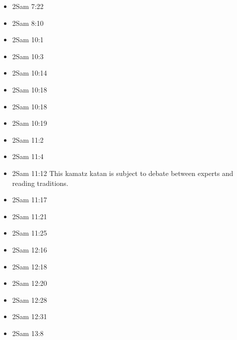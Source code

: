\documentclass[14pt]{book}
\begin{document}
\begin{multicols}{2}
\begin{itemize}
							\item 2Sam 7:22
							
							\item 2Sam 8:10
							
							\item 2Sam 10:1
							
							\item 2Sam 10:3
							
							\item 2Sam 10:14
							
							\item 2Sam 10:18
							
							\item 2Sam 10:18
							
							\item 2Sam 10:19
							
							\item 2Sam 11:2
							
							\item 2Sam 11:4
							
							\item 2Sam 11:12 This kamatz katan is subject to debate between experts and reading traditions.
							
							\item 2Sam 11:17
							
							\item 2Sam 11:21
							
							\item 2Sam 11:25
							
							\item 2Sam 12:16
							
							\item 2Sam 12:18
							
							\item 2Sam 12:20
							
							\item 2Sam 12:28
							
							\item 2Sam 12:31
							
							\item 2Sam 13:8
							

\end{itemize}
\end{multicols}
\end{document}
